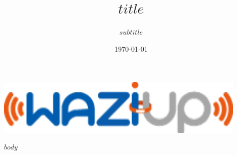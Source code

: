 \documentclass[a4paper,18pt]{article}
\title{$title$}
\subtitle{$subtitle$}
\begin{document}
\begin{titlepage}
\begin{center}


\includegraphics[width=12cm]{static/images/logo-waziup.png}

\vspace{7cm}
 
\vspace{2cm}
\date{\today}

\end{center}
\end{titlepage}

\setcounter{tocdepth}{$toc-depth$}
\tableofcontents
\newpage

$body$
\end{document}
